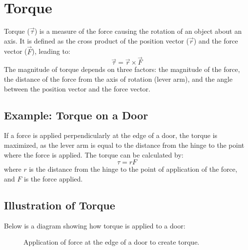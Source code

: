 \documentclass[12pt]{article}
\begin{document}
\section{Torque}

Torque (\(\vec{\tau}\)) is a measure of the force causing the rotation of an object about an axis. It is defined as the cross product of the position vector (\(\vec{r}\)) and the force vector (\(\vec{F}\)), leading to:
\[
\vec{\tau} = \vec{r} \times \vec{F}
\]
The magnitude of torque depends on three factors: the magnitude of the force, the distance of the force from the axis of rotation (lever arm), and the angle between the position vector and the force vector.

\subsection{Example: Torque on a Door}
If a force is applied perpendicularly at the edge of a door, the torque is maximized, as the lever arm is equal to the distance from the hinge to the point where the force is applied. The torque can be calculated by:
\[
\tau = rF
\]
where \(r\) is the distance from the hinge to the point of application of the force, and \(F\) is the force applied.

\subsection{Illustration of Torque}
Below is a diagram showing how torque is applied to a door:

\begin{figure}[h]
\centering
{}
\caption{Application of force at the edge of a door to create torque.}
\end{figure}
\end{document}
